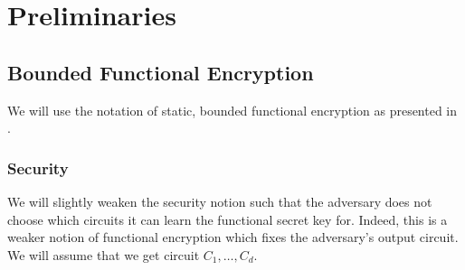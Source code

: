 \newcommand{\MPK}{\text{MPK}}
\newcommand{\MSK}{\text{MSK}}
\newcommand{\SK}{\text{SK}}
\newcommand{\Enc}{\texttt{Enc}}
\newcommand{\Dec}{\texttt{Dec}}
\newcommand{\FEEnc}{\text{FE.Enc}}
\newcommand{\FEDec}{\text{FE.Dec}}
\newcommand{\FESetup}{\text{FE.Setup}}
\newcommand{\FEKeygen}{\text{FE.Keygen}}
\newcommand{\FECT}{\text{CT}}
\newcommand{\adversD}{\mathcal{D}}


\section{Preliminaries}
\subsection{Bounded Functional Encryption}
We will use the notation of static, bounded functional encryption as presented in
\cite{garg2022dynamic}.

\subsubsection*{Security}
We will slightly weaken the security notion such that the adversary does not choose
which circuits it can learn the functional secret key for. Indeed, this is a weaker notion of functional encryption
which fixes the adversary's output circuit.
We will assume that we get circuit $C_1, \dots, C_d$.

